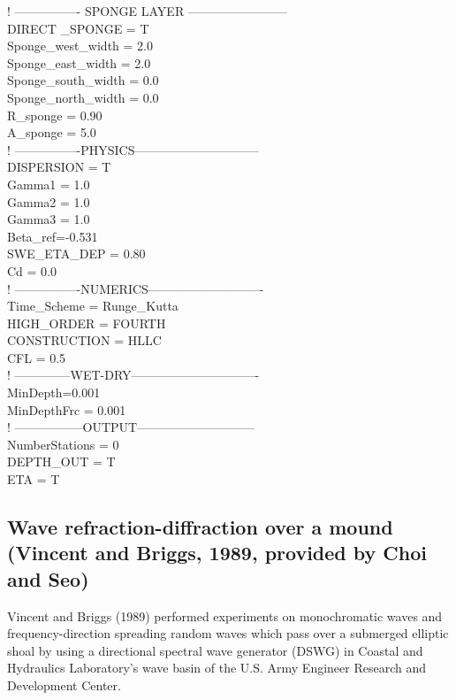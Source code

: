 \documentclass[11pt]{article}
\begin{document}
  ! ---------------- SPONGE LAYER ------------------------\\
DIRECT \_SPONGE = T\\
Sponge\_west\_width =  2.0\\
Sponge\_east\_width =  2.0\\
Sponge\_south\_width = 0.0\\
Sponge\_north\_width = 0.0\\
R\_sponge = 0.90\\
A\_sponge = 5.0\\

  ! ----------------PHYSICS------------------------------\\
DISPERSION = T\\
Gamma1 = 1.0\\
Gamma2 = 1.0\\
Gamma3 = 1.0\\
Beta\_ref=-0.531\\
SWE\_ETA\_DEP = 0.80\\
Cd = 0.0\\

  ! ----------------NUMERICS----------------------------\\
Time\_Scheme = Runge\_Kutta\\
HIGH\_ORDER = FOURTH\\
CONSTRUCTION = HLLC\\
CFL = 0.5\\

  ! --------------WET-DRY-------------------------------\\
MinDepth=0.001\\
MinDepthFrc = 0.001\\

  ! -----------------OUTPUT-----------------------------\\
NumberStations = 0\\
DEPTH\_OUT = T\\
ETA = T\\


\subsection{Wave refraction-diffraction over a mound (Vincent and Briggs, 1989, provided by Choi and Seo)}

Vincent and Briggs (1989) performed experiments on monochromatic waves and frequency-direction spreading random waves which pass over a submerged elliptic shoal by using a directional spectral wave generator (DSWG) in Coastal and Hydraulics Laboratory's wave basin of the U.S. Army Engineer Research and Development Center. 
\end{document}
